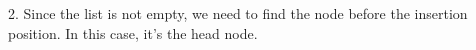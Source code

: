 \documentclass[preview]{standalone}
\begin{document}
2. Since the list is not empty, we need to find the node before the insertion position. In this case, it's the head node.\\
\end{document}
